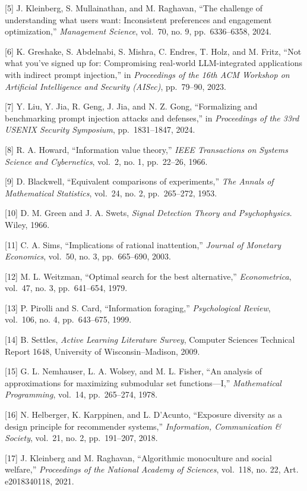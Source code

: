 \documentclass[
  chinese,
  conference,10pt]{IEEEtran}
\begin{document}
{[}5{]} J. Kleinberg, S. Mullainathan, and M. Raghavan, ``The challenge of understanding what users want: Inconsistent preferences and engagement optimization,'' \emph{Management Science}, vol.~70, no. 9, pp.~6336--6358, 2024.

{[}6{]} K. Greshake, S. Abdelnabi, S. Mishra, C. Endres, T. Holz, and M. Fritz, ``Not what you've signed up for: Compromising real-world LLM-integrated applications with indirect prompt injection,'' in \emph{Proceedings of the 16th ACM Workshop on Artificial Intelligence and Security (AISec)}, pp.~79--90, 2023.

{[}7{]} Y. Liu, Y. Jia, R. Geng, J. Jia, and N. Z. Gong, ``Formalizing and benchmarking prompt injection attacks and defenses,'' in \emph{Proceedings of the 33rd USENIX Security Symposium}, pp.~1831--1847, 2024.

{[}8{]} R. A. Howard, ``Information value theory,'' \emph{IEEE Transactions on Systems Science and Cybernetics}, vol.~2, no. 1, pp.~22--26, 1966.

{[}9{]} D. Blackwell, ``Equivalent comparisons of experiments,'' \emph{The Annals of Mathematical Statistics}, vol.~24, no. 2, pp.~265--272, 1953.

{[}10{]} D. M. Green and J. A. Swets, \emph{Signal Detection Theory and Psychophysics}. Wiley, 1966.

{[}11{]} C. A. Sims, ``Implications of rational inattention,'' \emph{Journal of Monetary Economics}, vol.~50, no. 3, pp.~665--690, 2003.

{[}12{]} M. L. Weitzman, ``Optimal search for the best alternative,'' \emph{Econometrica}, vol.~47, no. 3, pp.~641--654, 1979.

{[}13{]} P. Pirolli and S. Card, ``Information foraging,'' \emph{Psychological Review}, vol.~106, no. 4, pp.~643--675, 1999.

{[}14{]} B. Settles, \emph{Active Learning Literature Survey}, Computer Sciences Technical Report 1648, University of Wisconsin--Madison, 2009.

{[}15{]} G. L. Nemhauser, L. A. Wolsey, and M. L. Fisher, ``An analysis of approximations for maximizing submodular set functions---I,'' \emph{Mathematical Programming}, vol.~14, pp.~265--274, 1978.

{[}16{]} N. Helberger, K. Karppinen, and L. D'Acunto, ``Exposure diversity as a design principle for recommender systems,'' \emph{Information, Communication \& Society}, vol.~21, no. 2, pp.~191--207, 2018.

{[}17{]} J. Kleinberg and M. Raghavan, ``Algorithmic monoculture and social welfare,'' \emph{Proceedings of the National Academy of Sciences}, vol.~118, no. 22, Art. e2018340118, 2021.
\end{document}
